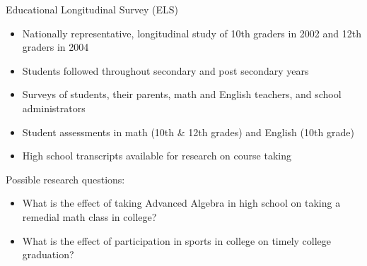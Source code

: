 \documentclass[
  8pt,
  ignorenonframetext,
  dvipsnames]{beamer}
\providecommand{\tightlist}{%
  \setlength{\itemsep}{0pt}\setlength{\parskip}{0pt}}
\let\olditem\item
\renewcommand{\item}{%
  \olditem\vspace{4pt}
}
\begin{document}
\begin{frame}{Educational Longitudinal Survey (ELS)}
\protect\hypertarget{educational-longitudinal-survey-els}{}

\begin{itemize}
\tightlist
\item
  Nationally representative, longitudinal study of 10th graders in 2002
  and 12th graders in 2004
\item
  Students followed throughout secondary and post secondary years
\item
  Surveys of students, their parents, math and English teachers, and
  school administrators
\item
  Student assessments in math (10th \& 12th grades) and English (10th
  grade)
\item
  High school transcripts available for research on course taking
\end{itemize}

\medskip

Possible research questions:

\begin{itemize}
\tightlist
\item
  What is the effect of taking Advanced Algebra in high school on taking
  a remedial math class in college?
\item
  What is the effect of participation in sports in college on timely
  college graduation?
\end{itemize}

\end{frame}
\end{document}
